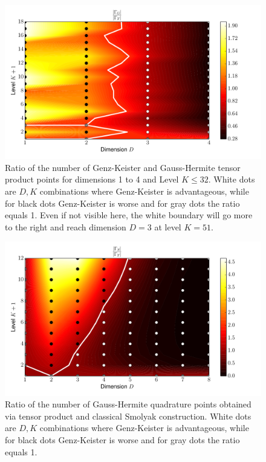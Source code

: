 \documentclass[a4paper,10pt]{article}
\begin{document}
\begin{figure}[h]
  \centering
  \includegraphics[width=0.8\linewidth]{./img/gk_hermitephy_ratio_large.pdf}
  \caption{Ratio of the number of Genz-Keister and Gauss-Hermite tensor product
  points for dimensions 1 to 4 and Level $K \leq 32$. White dots are $D,K$
  combinations where Genz-Keister is advantageous, while for black dots
  Genz-Keister is worse and for gray dots the ratio equals 1. Even if not visible here,
  the white boundary will go more to the right and reach dimension $D = 3$ at level $K = 51$.}
  \label{fig:gk_hermitephy_ratio_large}
\end{figure}

\begin{figure}[h]
  \centering
  \includegraphics[width=0.8\linewidth]{./img/smol_hermitephy_ratio.pdf}
  \caption{Ratio of the number of Gauss-Hermite quadrature points obtained
  via tensor product and classical Smolyak construction. White dots are $D,K$
  combinations where Genz-Keister is advantageous, while for black dots
  Genz-Keister is worse and for gray dots the ratio equals 1.}
  \label{fig:smol_hermitephy_ratio}
\end{figure}
\end{document}
